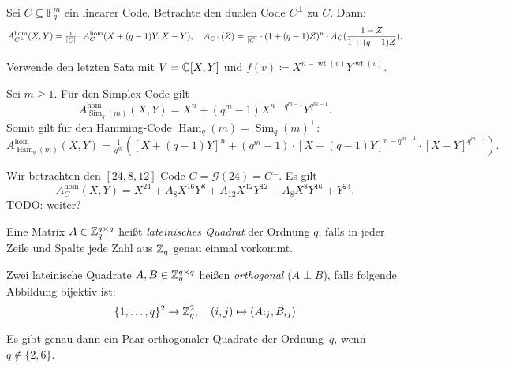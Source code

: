 \documentclass{cheat-sheet}
\newcommand{\F}{\mathbb{F}} %
\DeclareMathOperator{\wt}{wt} %
\newcommand{\homogen}{\text{hom}} %
\DeclareMathOperator{\Ham}{Ham} %
\DeclareMathOperator{\Sim}{Sim} %
\newcommand{\Golay}{\mathcal{G}} %
\begin{document}
\begin{satz}
  Sei $C \subseteq \F_q^m$ ein linearer Code.
  Betrachte den dualen Code $C^\perp$ zu $C$.
  Dann:
  \[
    A_{C^\perp}^\homogen(X, Y) = \tfrac{1}{\abs{C}} \cdot A_C^\homogen(X + (q-1)Y, X-Y), \quad
    A_{C^\perp}(Z) = \tfrac{1}{\abs{C}} \cdot (1 + (q-1) Z)^n \cdot A_C(\frac{1-Z}{1+(q-1)Z}).
  \]
\end{satz}

\begin{beweisidee}
  Verwende den letzten Satz mit $V = \mathbb{C}[X, Y]$ und $f(v) \coloneqq X^{n - \wt(v)} Y^{\wt(v)}$.
\end{beweisidee}

\begin{bsp}
  Sei $m \geq 1$.
  Für den Simplex-Code gilt
  \[
    A_{\Sim_q(m)}^\homogen (X, Y) = X^n + (q^m - 1) X^{n - q^{m-1}} Y^{q^{m-1}}.
  \]
  Somit gilt für den Hamming-Code $\Ham_q(m) = \Sim_q(m)^\perp$:
  \[
    A_{\Ham_q(m)}^\homogen (X, Y) = \tfrac{1}{q^m} \left( [X+(q-1)Y]^n + (q^m - 1) \cdot [X + (q-1) Y]^{n - q^{m-1}} \cdot [X-Y]^{q^{m-1}} \right).
  \]
\end{bsp}

\begin{bsp}
  Wir betrachten den $[24, 8, 12]$-Code $C = \Golay(24) = C^\perp$.
  Es gilt
  \[
    A_C^\homogen (X, Y) = X^{24} + A_8 X^{16} Y^8 + A_{12} X^{12} Y^{12} + A_8 X^8 Y^{16} + Y^{24}.
  \]
  TODO: weiter?
\end{bsp}




\begin{defn}
  Eine Matrix $A \in \mathbb{Z}_q^{q \times q}$ heißt \emph{lateinisches Quadrat} der Ordnung $q$, falls in jeder Zeile und Spalte jede Zahl aus $\mathbb{Z}_q$ genau einmal vorkommt.
\end{defn}

\begin{defn}
  Zwei lateinische Quadrate $A, B \in \mathbb{Z}_q^{q \times q}$ heißen \emph{orthogonal} ($A \perp B$), falls folgende Abbildung bijektiv ist:
  \[
    \{ 1, \ldots, q \}^2 \to \mathbb{Z}_q^2, \quad
    (i, j) \mapsto (A_{ij}, B_{ij})
  \]
\end{defn}

\begin{satz}
  Es gibt genau dann ein Paar orthogonaler Quadrate der Ordnung~$q$, wenn $q \not\in \{ 2, 6 \}$.
\end{satz}
\end{document}
